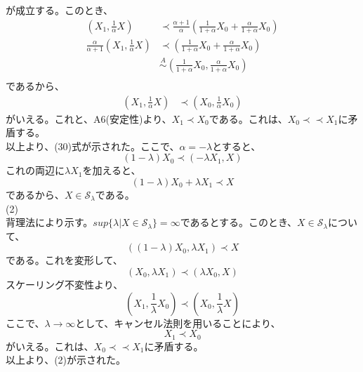 \documentclass[a4paper,11pt]{jsarticle}
\begin{document}
が成立する。このとき、
\begin{align}
    (X_1,\frac{1}{\alpha}X) &\prec \frac{\alpha+1}{\alpha}(\frac{1}{1+\alpha}X_0+\frac{\alpha}{1+\alpha}X_0)\\
    \frac{\alpha}{\alpha+1}(X_1,\frac{1}{\alpha}X) &\prec (\frac{1}{1+\alpha}X_0+\frac{\alpha}{1+\alpha}X_0)\\
    &\overset{A}{\sim} (\frac{1}{1+\alpha}X_0,\frac{\alpha}{1+\alpha}X_0)\\
\end{align}
であるから、
\begin{align}
    (X_1,\frac{1}{\alpha}X) &\prec (X_0,\frac{1}{\alpha}X_0)
\end{align}
がいえる。これと、A6(安定性)より、$X_1 \prec X_0$である。これは、$X_0 \prec \prec X_1$に矛盾する。\\
以上より、(30)式が示された。ここで、$\alpha = -\lambda$とすると、
\begin{equation}
    (1-\lambda)X_0 \prec (-\lambda X_1,X)
\end{equation}
これの両辺に$\lambda X_1$を加えると、
\begin{equation}
    (1-\lambda)X_0 + \lambda X_1 \prec X
\end{equation}
であるから、$X \in \mathcal{S}_{\lambda}$である。\\
(2)\\
背理法により示す。$sup\{\lambda|X \in \mathcal{S}_{\lambda}\}=\infty$であるとする。このとき、$X\in \mathcal{S}_{\lambda}$について、
\begin{equation}
    ((1-\lambda)X_0,\lambda X_1) \prec X
\end{equation}
である。これを変形して、
\begin{equation}
    (X_0,\lambda X_1) \prec (\lambda X_0,X)
\end{equation}
スケーリング不変性より、
\begin{equation}
    (X_1,\frac{1}{\lambda}X_0) \prec (X_0,\frac{1}{\lambda}X)
\end{equation}  
ここで、$\lambda \rightarrow \infty$として、キャンセル法則を用いることにより、
\begin{equation}
    X_1 \prec X_0
\end{equation}
がいえる。これは、$X_0 \prec \prec X_1$に矛盾する。\\
以上より、(2)が示された。\qedsymbol\\
\end{document}
